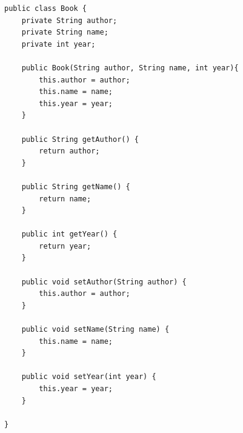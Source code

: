 \documentclass[14pt, a4paper]{extarticle}
\newenvironment{code}{\captionsetup{type=listing}}{}
\begin{document}
\begin{code}
\begin{Verbatim}[frame=single, fontsize=\footnotesize]
public class Book {
    private String author;
    private String name;
    private int year;

    public Book(String author, String name, int year){
        this.author = author;
        this.name = name;
        this.year = year;
    }

    public String getAuthor() {
        return author;
    }

    public String getName() {
        return name;
    }

    public int getYear() {
        return year;
    }

    public void setAuthor(String author) {
        this.author = author;
    }

    public void setName(String name) {
        this.name = name;
    }

    public void setYear(int year) {
        this.year = year;
    }

}
\end{Verbatim}
\end{code}
\end{document}
